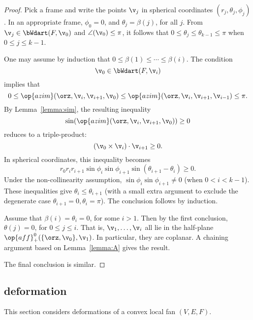 \begin{proof}  
Pick a frame and write the points $\v_j$ in spherical coordinates
$(r_j,\theta_j,\phi_j)$.  In an appropriate frame, $\phi_0=0$, and
$\theta_j=\beta(j)$, for all $j$.  From $\v_j\in \bWdart(F,\v_0)$
and $\angle(\v_0)\le\pi$, it follows that
$0\le\theta_j\le\theta_{k-1}\le\pi$ when $0\le j\le k-1$.

One may assume by induction that $0\le \beta(1)\le\cdots\le
\beta(i)$.  The condition
\begin{displaymath}
\v_0\in \bWdart(F,\v_i)
\end{displaymath}
implies that
\begin{displaymath}
  0 \le \op{azim}(\orz,\v_i,\v_{i+1},\v_0)
\le \op{azim}(\orz,\v_i,\v_{i+1},\v_{i-1})\le\pi.
\end{displaymath}
By Lemma~\ref{lemma:sim}, the resulting inequality
\begin{displaymath}
\sin(\op{azim}(\orz,\v_i,\v_{i+1},\v_0))\ge 0
\end{displaymath}
reduces to a triple-product:
\begin{displaymath}
(\v_0 \times \v_i)\cdot \v_{i+1}\ge 0.
\end{displaymath}
In spherical coordinates, this inequality becomes
\begin{displaymath}
r_0r_ir_{i+1}\sin\phi_i\sin\phi_{i+1}\sin(\theta_{i+1}-\theta_i)\ge0.
\end{displaymath}
Under the non-collinearity assumption, $\sin\phi_i\sin\phi_{i+1}\ne0$
(when $0< i < k-1$).  These inequalities give
$\theta_i\le\theta_{i+1}$ (with a small extra argument to exclude the
degenerate case $\theta_{i+1}=0,\theta_i=\pi$).  The conclusion
follows by induction.

Assume that $\beta(i)=\theta_i=0$, for some $i>1$.  Then by the first
conclusion, $\theta(j)=0$, for $0\le j\le i$.  That is, 
$\v_1,\ldots,\v_i$ all lie in the half-plane
$\op{aff}^0_+(\{\orz,\v_0\},\v_1)$.  In particular, they are coplanar.
A chaining argument based on Lemma~\ref{lemma:A} gives the result.

The final conclusion is similar.
\end{proof}



\subsection{deformation}\label{sec:deformation}

This section considers deformations of a convex local fan $(V,E,F)$.

